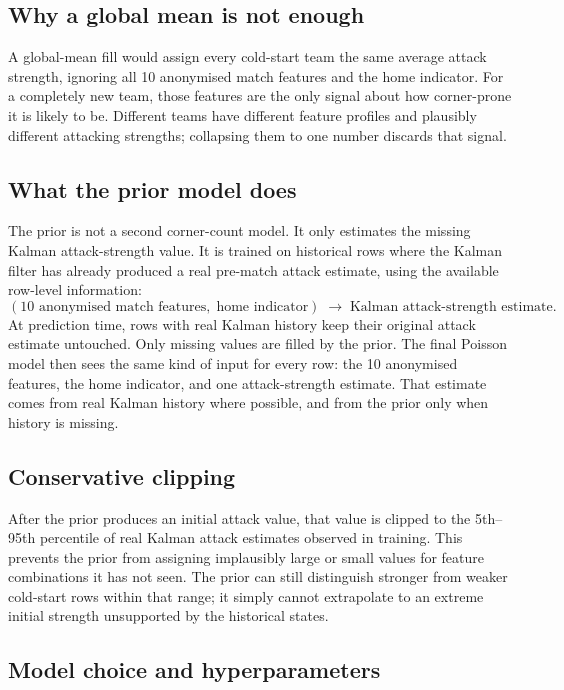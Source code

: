 \documentclass[11pt]{article}
\begin{document}
\subsection{Why a global mean is not enough}

A global-mean fill would assign every cold-start team the same average
attack strength, ignoring all 10 anonymised match features and the home
indicator. For a completely new team, those features are the only signal
about how corner-prone it is likely to be.
Different teams have different feature profiles and plausibly different
attacking strengths; collapsing them to one number discards that signal.

\subsection{What the prior model does}

The prior is not a second corner-count model. It only estimates the missing
Kalman attack-strength value. It is trained on historical rows where the
Kalman filter has already produced a real pre-match attack estimate, using the
available row-level information:
\[
(\text{10 anonymised match features},\;\text{home indicator})
\;\longrightarrow\;
\text{Kalman attack-strength estimate}.
\]
At prediction time, rows with real Kalman history keep their original attack
estimate untouched. Only missing values are filled by the prior. The final
Poisson model then sees the same kind of input for every row: the 10 anonymised
features, the home indicator, and one attack-strength estimate. That estimate
comes from real Kalman history where possible, and from the prior only when
history is missing.

\subsection{Conservative clipping}

After the prior produces an initial attack value, that value is clipped to the
5th--95th percentile of real Kalman attack estimates observed in training.
This prevents the prior from assigning implausibly large or small values for
feature combinations it has not seen. The prior can still distinguish stronger
from weaker cold-start rows within that range; it simply cannot extrapolate to
an extreme initial strength unsupported by the historical states.


\subsection{Model choice and hyperparameters}
\end{document}
